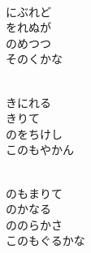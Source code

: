 \documentclass[10pt,b5j]{tarticle} %
\begin{document}
\begin{enumerate}
\begin{minipage}[c]{\blocksize}
    \end{minipage}
    \begin{minipage}[c]{\blocksize}
        
        \vspace{\linespace}
        \item~\\
        にぶれど\\
        をれぬが\\
        のめつつ\\
        そのくかな
        
    \end{minipage}
    \begin{minipage}[c]{\blocksize}
        
        \vspace{\linespace}
        \item~\\
        きにれる\\
        きりて\\
        のをちけし\\
        このもやかん
        
    \end{minipage}
    \begin{minipage}[c]{\blocksize}
        
        \vspace{\linespace}
        \item~\\
        のもまりて\\
        のかなる\\
        ののらかさ\\
        このもぐるかな
        
    \end{minipage}
    \begin{minipage}[c]{\blocksize}
        

\end{minipage}
\end{enumerate}
\end{document}
